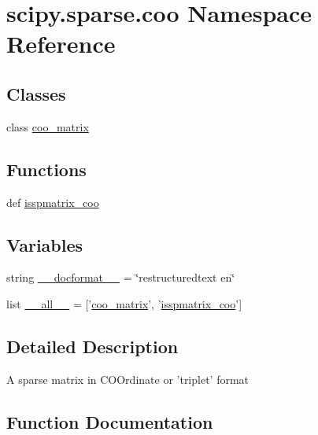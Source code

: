 \hypertarget{namespacescipy_1_1sparse_1_1coo}{}\section{scipy.\+sparse.\+coo Namespace Reference}
\label{namespacescipy_1_1sparse_1_1coo}
\subsection*{Classes}
\begin{DoxyCompactItemize}
\item 
class \hyperlink{classscipy_1_1sparse_1_1coo_1_1coo__matrix}{coo\+\_\+matrix}
\end{DoxyCompactItemize}
\subsection*{Functions}
\begin{DoxyCompactItemize}
\item 
def \hyperlink{namespacescipy_1_1sparse_1_1coo_a1cacce1e7db17b2cf71674de1a8c1948}{isspmatrix\+\_\+coo}
\end{DoxyCompactItemize}
\subsection*{Variables}
\begin{DoxyCompactItemize}
\item 
string \hyperlink{namespacescipy_1_1sparse_1_1coo_afe67dfac2d4d855b6f887eb300a444b4}{\+\_\+\+\_\+docformat\+\_\+\+\_\+} = \char`\"{}restructuredtext en\char`\"{}
\item 
list \hyperlink{namespacescipy_1_1sparse_1_1coo_a7ee75468a7c9aa020ea1f9bed0de979c}{\+\_\+\+\_\+all\+\_\+\+\_\+} = \mbox{[}'\hyperlink{classscipy_1_1sparse_1_1coo_1_1coo__matrix}{coo\+\_\+matrix}', '\hyperlink{namespacescipy_1_1sparse_1_1coo_a1cacce1e7db17b2cf71674de1a8c1948}{isspmatrix\+\_\+coo}'\mbox{]}
\end{DoxyCompactItemize}


\subsection{Detailed Description}
\begin{DoxyVerb}A sparse matrix in COOrdinate or 'triplet' format\end{DoxyVerb}
 

\subsection{Function Documentation}
\hypertarget{namespacescipy_1_1sparse_1_1coo_a1cacce1e7db17b2cf71674de1a8c1948}{}
